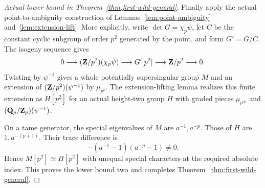 \begin{proof}[Actual lower bound in Theorem~\ref{thm:first-wild-general}]
Finally apply the actual point-to-ambiguity construction of Lemmas~\ref{lem:point-ambiguity} and~\ref{lem:extension-lift}. More explicitly, write $\det G=\chi_p\psi$, let $C$ be the constant cyclic subgroup of order $p^2$ generated by the point, and form $G'=G/C$. The isogeny sequence gives
\[
0\longrightarrow(\mathbf Z/p^2)(\chi_p\psi)
 \longrightarrow G'[p^2]\longrightarrow\mathbf Z/p^2\longrightarrow0.
\]
Twisting by $\psi^{-1}$ gives a whole potentially supersingular group $M$ and an extension of $(\mathbf Z/p^2)(\psi^{-1})$ by $\mu_{p^2}$. The extension-lifting lemma realizes this finite extension as $H[p^2]$ for an actual height-two group $H$ with graded pieces $\mu_{p^\infty}$ and $(\mathbf Q_p/\mathbf Z_p)(\psi^{-1})$.

On a tame generator, the special eigenvalues of $M$ are $a^{-1},a^{-p}$. Those of $H$ are $1,a^{-(p+1)}$. Their trace difference is
\[
                -(a^{-1}-1)(a^{-p}-1)\ne0.
\]
Hence $M[p^2]\simeq H[p^2]$ with unequal special characters at the required absolute index. This proves the lower bound two and completes Theorem~\ref{thm:first-wild-general}.
\end{proof}
